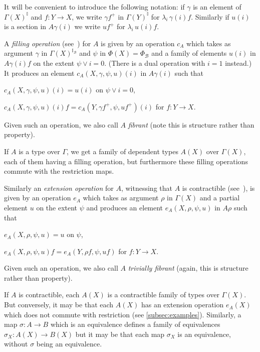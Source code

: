 \documentclass[10pt,a4paper,draft]{article}
\newcommand{\II}{\mathbb{I}}
\newcommand{\BB}{\mathcal{B}}
\renewcommand{\~}{\widetilde}
\newcommand{\cofuniv}{\Phi}
\newcommand{\cofunivConst}{\Phi}
\theoremstyle{definition}
\theoremstyle{remark} %
\begin{document}
It will be convenient to introduce the following notation: if
$\gamma$ is an element of $\Gamma(X)^{\II}$ and
$f:Y\rightarrow X$, we write $\gamma f^+$ in $\Gamma(Y)^{\II}$
for $\lambda_i\,\gamma(i)f$. Similarly if $u(i)$ is a section
in $A\gamma(i)$ we write $uf^+$ for $\lambda_i\,u(i)f$.



A {\em filling operation}
(see~\cite{OrtonP16,CHM18}) for $A$ is given by an operation $c_A$ which takes as
argument $\gamma$ in $\Gamma(X)^{\II_{\BB}}$ and $\psi$ in $\cofunivConst(X) = \cofuniv_{\BB}$
and a family of elements $u(i)$ in $A\gamma(i)f$ on the extent
$\psi\vee i = 0$. (There is a dual operation with $i=1$ instead.)
It produces an element $c_A(X,\gamma,\psi,u)(i)$ in $A\gamma(i)$ such that
\begin{conditions}
\item $c_A(X,\gamma,\psi,u)(i) = u(i)$ on $\psi\vee i=0$,
\item $c_A(X,\gamma,\psi,u)(i)f = c_A(Y,\gamma f^+,\psi, u f^+)(i)$ for $f:Y\rightarrow X$.
\end{conditions}
Given such an operation, we also call $A$ \emph{fibrant} (note this is structure rather than property).

If $A$ is a type over $\Gamma$, we get a family of dependent types $A(X)$
over $\Gamma(X)$, each of them having a filling operation, but furthermore
these filling operations commute with the restriction maps.

Similarly an {\em extension operation} for $A$, witnessing that $A$ is contractible
(see~\cite{CCHM15}), is given by an operation $e_A$ which takes as argument $\rho$
in $\Gamma(X)$ and a partial element $u$ on the extent $\psi$ and produces
an element $e_A(X,\rho,\psi,u)$ in $A\rho$ such that
\begin{conditions}
\item $e_A(X,\rho,\psi,u) = u$ on $\psi$,
\item $e_A(X,\rho,\psi,u)f = e_A(Y,\rho f,\psi, uf)$ for $f:Y\rightarrow X$.
\end{conditions}
Given such an operation, we also call $A$ \emph{trivially fibrant} (again, this is structure rather than property).

If $A$ is contractible, each $A(X)$ is a contractible family of types over $\Gamma(X)$.
But conversely, it may be that each $A(X)$ has an extension operation $e_A(X)$ which
does not commute with restriction (see \cref{subsec:examples}).
Similarly, a map $\sigma:A\rightarrow B$
which is an equivalence defines a family of equivalences $\sigma_X:A(X)\rightarrow B(X)$
but it may be that each map $\sigma_X$ is an equivalence, without $\sigma$ being
an equivalence.
\end{document}
